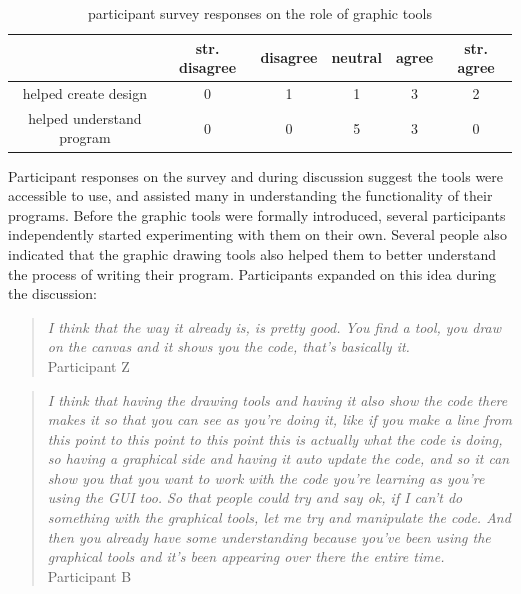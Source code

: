 \documentclass{sigchi}
\newcommand\tabhead[1]{\small\textbf{#1}}
\begin{document}
\begin{table}
  \centering
  \begin{tabular}{|c|c|c|c|c|c|}
    \hline
    \multicolumn{1}{|p{0.75cm}|}{\centering\tabhead{}} &
    \multicolumn{1}{|p{1cm}|}{\centering\small{str. disagree}} &
    \multicolumn{1}{|p{0.8cm}|}{\centering\small{disagree}}&
    \multicolumn{1}{|p{0.8cm}|}{\centering\small{neutral}}&
    \multicolumn{1}{|p{0.8cm}|}{\centering\small{agree}}&
    \multicolumn{1}{|p{0.8cm}|}{\centering\small{str. agree}}\\
    \hline
    \small{helped create design} & 0 & 1 & 1 & 3 & 2 \\
    \hline
    \small{helped understand program} & 0 & 0 & 5 & 3& 0  \\
    \hline
  \end{tabular}
  \caption{participant survey responses on the role of graphic tools}
\label{table:graphic_tools}
\end{table}

Participant responses on the survey and during discussion suggest the tools were accessible to use, and assisted many in understanding the functionality of their programs. Before the graphic tools were formally introduced, several participants independently started experimenting with them on their own. Several people also indicated that the graphic drawing tools also helped them to better understand the process of writing their program. Participants expanded on this idea during the discussion:
\begin{quotation}
\textit{I think that the way it already is, is pretty good. You find a tool, you draw on the canvas and it shows you the code, that's basically it.}
\\Participant Z
\end{quotation}

\begin{quotation}
\textit{I think that having the drawing tools and having it also show the code there makes it so that you can see as you're doing it, like if you make a line from this point to this point to this point this is actually what the code is doing, so having a graphical side and having it auto update the code, and so it can show you that you want to work with the code you're learning as you're using the GUI too. So that people could try and say ok, if I can't do something with the graphical tools, let me try and manipulate the code. And then you already have some understanding because you've been using the graphical tools and it's been appearing over there the entire time.}
\\Participant B
\end{quotation}
\end{document}

